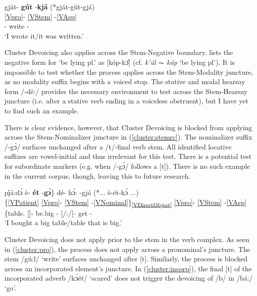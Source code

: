 \documentclass[output=paper]{langscibook}
\begin{document}
\ea \label{cluster:stemasp}
\glll gját- \textbf{gút} -\textbf{kjá} (*gját-gút-gjá) \\
{\ref{Vpro}}- \ref{VStem} -\ref{VAsp} \\
[\First\Sg/\Aarg:\Pl/\Obj]- write -{\Pfv} \\
\trans `I wrote it/it was written.' \citep[][85]{Miller:2018} %
\z 

Cluster Devoicing also applies across the Stem-Negative boundary. \citet[177]{Watkins:1984} lists the negative form for `be lying pl.' as [kóp-k\^{ɔ}] (cf. \textit{k'úl $\thicksim$ kóp} `be lying pl'). It is impossible to test whether the process applies across the Stem-Modality juncture, as no modality suffix begins with a voiced stop. The stative and modal hearsay form /-dê:/ provides the necessary environment to test across the Stem-Hearsay juncture (i.e. after a stative verb ending in a voiceless obstruent), but I have yet to find such an example.

There is clear evidence, however, that Cluster Devoicing is blocked from applying across the Stem-Nominalizer juncture in (\ref{cluster:stemrc}). The nominalizer suffix /-g\`{ɔ}/ surfaces unchanged after a /t/-final verb stem. All identified locative suffixes are vowel-initial and thus irrelevant for this test. There is a potential test for subordinate markers (e.g. when /-g\`{ɔ}/ follows a [t]). There is no such example in the current corpus, though, leaving this to future research.

\ea \label{cluster:stemrc}
\glll {\{}p\k{í}á:d\`{ɔ} è- \textbf{ét} -\textbf{g\`{ɔ}}{\}} dé- h\'{ɔ}: -gjá (*... è-ét-k\`{ɔ} ...)\\
{\{}\ref{VPatient} {\ref{Vpro}}- \ref{VStem} -\ref{VNominal}{\}}\textsubscript{\ref{VDirectObject}} {\ref{Vpro}}- \ref{VStem} -\ref{VAsp} \\
{\{}table.{\Inv} [\Third\Inv]- be.big -\Nom{\}} [\First\Sg/\Aarg:\Inv/\Obj]- get -{\Pfv} \\
\trans `I bought a big table/table that is big.' \citep[][230]{Watkins:1984}  %
\z 

Cluster Devoicing does not apply prior to the stem in the verb complex. As seen in (\ref{cluster:pro}), the process does not apply across a pronominal's juncture. The stem /gú:l/ `write' surfaces unchanged after [t]. Similarly, the process is blocked across an incorporated element's juncture. In (\ref{cluster:incorp}), the final [t] of the incorporated adverb /k\`{ɔ}ét/ `scared' does not trigger the devoicing of /b/ in /bá:/ `go'.
\end{document}
